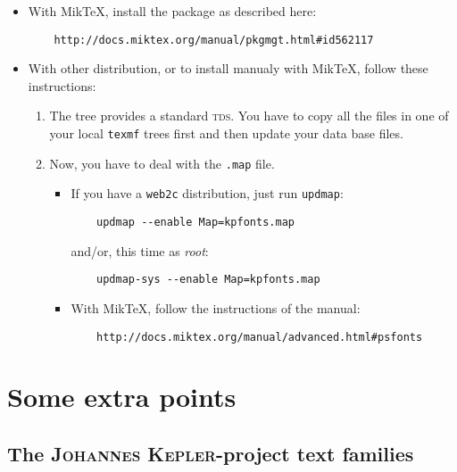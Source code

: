\documentclass[a4paper,11pt]{christophe}
\begin{document}
\begin{itemize}
	\item 
	
With MikTeX, install the package as described here:

	\begin{verbatim}
	http://docs.miktex.org/manual/pkgmgt.html#id562117
	\end{verbatim}
	
	\item
	
With other distribution, or to install manualy with MikTeX, follow these instructions:

\begin{enumerate}
	\item 
The tree provides a standard \textsc{tds}. You have to copy all the files in one of your local \texttt{texmf} trees first and then update your data base files.
	\item
Now, you have to deal with the \texttt{.map} file.
\begin{itemize}
	\item 
If you have a \texttt{web2c} distribution, just run \texttt{updmap}:

	\begin{verbatim}
	updmap --enable Map=kpfonts.map
	\end{verbatim}
	
and/or, this time as \textit{root}:

	\begin{verbatim}
	updmap-sys --enable Map=kpfonts.map
	\end{verbatim}
	
	\item
With MikTeX, follow the instructions of the manual:

	\begin{verbatim}
	http://docs.miktex.org/manual/advanced.html#psfonts
	\end{verbatim}
	
\end{itemize}
	
\end{enumerate}
	
\end{itemize}

\section{Some extra points}

\subsection{The \textsc{Johannes Kepler}-project text families}
\end{document}
